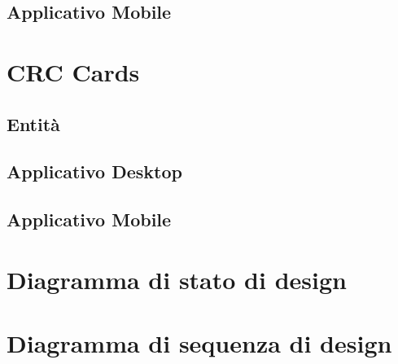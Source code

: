 \subsection{Applicativo Mobile}
\section{CRC  Cards}
\subsection{Entità}
    
     
    
    
\subsection{Applicativo Desktop}
    
    
    
    
    
    
    
    
    
    
    
    
\subsection{Applicativo Mobile}
    
    
\section{Diagramma di stato di design}

\section{Diagramma di sequenza di design}